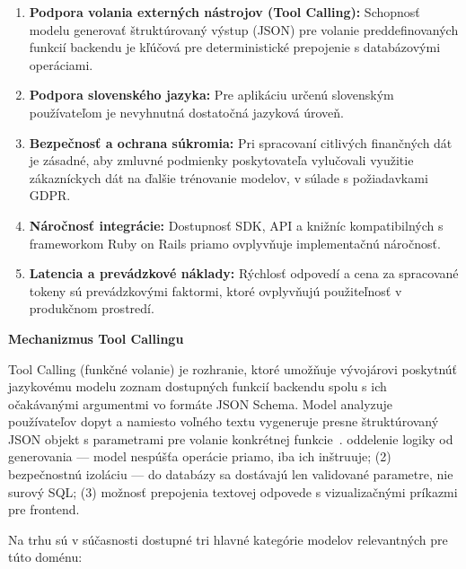 \begin{enumerate}
	\item \textbf{Podpora volania externých nástrojov (Tool Calling):} Schopnosť
		modelu generovať štruktúrovaný výstup (JSON) pre volanie preddefinovaných
		funkcií backendu je kľúčová pre deterministické prepojenie s databázovými
		operáciami.

	\item \textbf{Podpora slovenského jazyka:} Pre aplikáciu určenú slovenským
		používateľom je nevyhnutná dostatočná jazyková úroveň.

	\item \textbf{Bezpečnosť a ochrana súkromia:} Pri spracovaní citlivých
		finančných dát je zásadné, aby zmluvné podmienky poskytovateľa vylučovali využitie
		zákazníckych dát na ďalšie trénovanie modelov, v súlade s požiadavkami GDPR.

	\item \textbf{Náročnosť integrácie:} Dostupnosť SDK, API a knižníc kompatibilných
		s frameworkom Ruby on Rails priamo ovplyvňuje implementačnú náročnosť.

	\item \textbf{Latencia a prevádzkové náklady:} Rýchlosť odpovedí a cena za
		spracované tokeny sú prevádzkovými faktormi, ktoré ovplyvňujú použiteľnosť v produkčnom
		prostredí.
\end{enumerate}

\vspace{1em}

\textbf{Mechanizmus Tool Callingu}

Tool Calling (funkčné volanie) je rozhranie, ktoré umožňuje vývojárovi poskytnúť jazykovému
modelu zoznam dostupných funkcií backendu spolu s ich očakávanými argumentmi vo formáte
JSON Schema. Model analyzuje používateľov dopyt a namiesto voľného textu
vygeneruje presne štruktúrovaný JSON objekt s parametrami pre volanie konkrétnej
funkcie~\cite{schick2023toolformer, patil2023gorilla, ruby2025}. %
oddelenie logiky od generovania — model nespúšťa operácie priamo, iba ich inštruuje;
(2) bezpečnostnú izoláciu — do databázy sa dostávajú len validované parametre, nie
surový SQL; (3) možnosť prepojenia textovej odpovede s vizualizačnými príkazmi
pre frontend.

\vspace{1em}

Na trhu sú v súčasnosti dostupné tri hlavné kategórie modelov relevantných pre túto
doménu:


